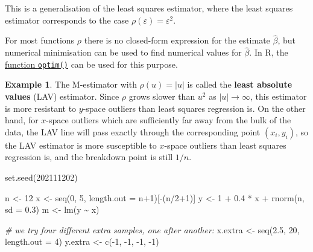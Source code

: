 \documentclass[
  a4paper,
]{article}
\newenvironment{Shaded}{\begin{snugshade}}{\end{snugshade}}
\newcommand{\AttributeTok}[1]{\textcolor[rgb]{0.77,0.63,0.00}{#1}}
\newcommand{\CommentTok}[1]{\textcolor[rgb]{0.56,0.35,0.01}{\textit{#1}}}
\newcommand{\DecValTok}[1]{\textcolor[rgb]{0.00,0.00,0.81}{#1}}
\newcommand{\FloatTok}[1]{\textcolor[rgb]{0.00,0.00,0.81}{#1}}
\newcommand{\FunctionTok}[1]{\textcolor[rgb]{0.00,0.00,0.00}{#1}}
\newcommand{\NormalTok}[1]{#1}
\newcommand{\OtherTok}[1]{\textcolor[rgb]{0.56,0.35,0.01}{#1}}
\newcommand{\SpecialCharTok}[1]{\textcolor[rgb]{0.00,0.00,0.00}{#1}}
\theoremstyle{definition}
\theoremstyle{definition}
\newtheorem{example}{Example}[section]
\theoremstyle{definition}
\theoremstyle{definition}
\theoremstyle{remark}
\begin{document}
This is a generalisation of the least squares estimator, where the least
squares estimator corresponds to the case \(\rho(\varepsilon) = \varepsilon^2\).

For most functions \(\rho\) there is no closed-form expression for
the estimate \(\hat\beta\), but numerical minimisation can be used to find
numerical values for \(\hat\beta\). In R, the \href{https://rdrr.io/r/stats/optim.html}{function \texttt{optim()}}
can be used for this purpose.

\begin{example}
\protect\hypertarget{exm:LAV}{}\label{exm:LAV}The M-estimator with \(\rho(u) = |u|\) is called the
\textbf{least absolute values} (LAV) estimator. Since \(\rho\) grows
slower than \(u^2\) as \(|u| \to\infty\), this estimator is more resistant
to \(y\)-space outliers than least squares regression is. On the other hand,
for \(x\)-space outliers which are sufficiently far away from the bulk of the
data, the LAV line will pass exactly through the corresponding point
\((x_i, y_i)\), so the LAV estimator is more susceptible to \(x\)-space outliers
than least squares regression is, and the breakdown point is still \(1/n\).

\begin{Shaded}
\begin{Highlighting}[]
\FunctionTok{set.seed}\NormalTok{(}\DecValTok{202111202}\NormalTok{)}

\NormalTok{n }\OtherTok{\textless{}{-}} \DecValTok{12}
\NormalTok{x }\OtherTok{\textless{}{-}} \FunctionTok{seq}\NormalTok{(}\DecValTok{0}\NormalTok{, }\DecValTok{5}\NormalTok{, }\AttributeTok{length.out =}\NormalTok{ n}\SpecialCharTok{+}\DecValTok{1}\NormalTok{)[}\SpecialCharTok{{-}}\NormalTok{(n}\SpecialCharTok{/}\DecValTok{2}\SpecialCharTok{+}\DecValTok{1}\NormalTok{)]}
\NormalTok{y }\OtherTok{\textless{}{-}} \DecValTok{1} \SpecialCharTok{+} \FloatTok{0.4} \SpecialCharTok{*}\NormalTok{ x }\SpecialCharTok{+} \FunctionTok{rnorm}\NormalTok{(n, }\AttributeTok{sd =} \FloatTok{0.3}\NormalTok{)}
\NormalTok{m }\OtherTok{\textless{}{-}} \FunctionTok{lm}\NormalTok{(y }\SpecialCharTok{\textasciitilde{}}\NormalTok{ x)}

\CommentTok{\# we try four different extra samples, one after another:}
\NormalTok{x.extra }\OtherTok{\textless{}{-}} \FunctionTok{seq}\NormalTok{(}\FloatTok{2.5}\NormalTok{, }\DecValTok{20}\NormalTok{, }\AttributeTok{length.out =} \DecValTok{4}\NormalTok{)}
\NormalTok{y.extra }\OtherTok{\textless{}{-}} \FunctionTok{c}\NormalTok{(}\SpecialCharTok{{-}}\DecValTok{1}\NormalTok{, }\SpecialCharTok{{-}}\DecValTok{1}\NormalTok{, }\SpecialCharTok{{-}}\DecValTok{1}\NormalTok{, }\SpecialCharTok{{-}}\DecValTok{1}\NormalTok{)}


\end{Highlighting}
\end{Shaded}
\end{example}
\end{document}
